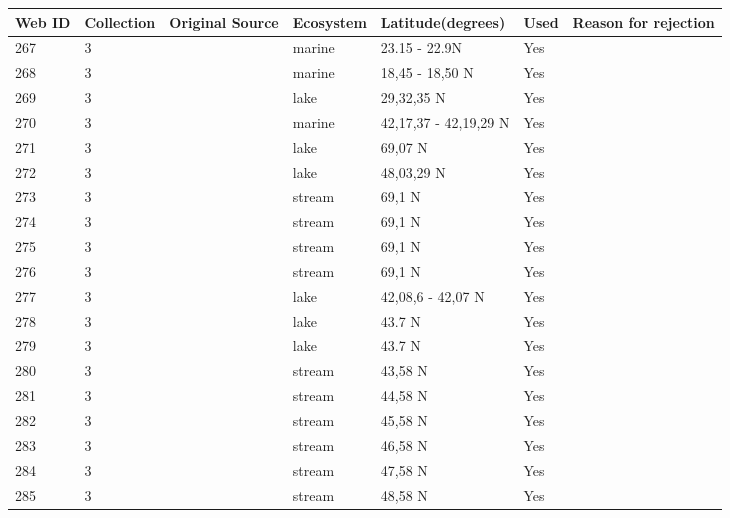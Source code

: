 \documentclass[12pt]{article}
\begin{document}
\begin{landscape}
    \begin{table}[h!]
    \centering
    {\footnotesize
      \begin{tabular}{p{2.8cm}p{1.3cm}p{3cm}p{2.2cm}p{2.5cm}lp{8.2cm}}
        \hline
        Web ID & Collection & Original Source & Ecosystem & Latitude(degrees) & Used  & Reason for rejection  \\
        \hline
        267   & 3 & \cite{Zetina-Rejon2003}  & marine & 23.15 - 22.9N & Yes  &     \\
        268   & 3 & \cite{Cruz-Escalona2007}  & marine & 18,45 - 18,50 N & Yes  &     \\
        269   & 3 & \cite{Liu2007}  & lake  & 29,32,35 N & Yes  &     \\
        270   & 3 & \cite{Filgueira2011}  & marine & 42,17,37 - 42,19,29 N & Yes   &       \\
        271   & 3 & \cite{Amundsen2013}  & lake  & 69,07 N & Yes   &        \\
        272   & 3 & \cite{Hampton2011}    & lake  & 48,03,29 N & Yes   &       \\
        273   & 3 & \cite{Parker2006}  & stream & 69,1 N & Yes   &       \\
        274   & 3 & \cite{Parker2006}  & stream & 69,1 N & Yes   &       \\
        275   & 3 & \cite{Parker2006}  & stream & 69,1 N & Yes   &       \\
        276   & 3 & \cite{Parker2006}  & stream & 69,1 N & Yes   &       \\
        277   & 3 & \cite{Massana1996}  & lake  & 42,08,6 - 42,07 N & Yes   &       \\
        278   & 3 & \cite{Stewart2011}    & lake  & 43.7 N & Yes   &       \\
        279   & 3 & \cite{Stewart2011}    & lake  & 43.7 N & Yes   &       \\
        280   & 3 & \cite{Cromar1996}  & stream & 43,58 N & Yes   &       \\
        281   & 3 & \cite{Cromar1996}  & stream & 44,58 N & Yes   &       \\
        282   & 3 & \cite{Cromar1996}  & stream & 45,58 N & Yes   &       \\
        283   & 3 & \cite{Cromar1996}  & stream & 46,58 N & Yes   &       \\
        284   & 3 & \cite{Cromar1996}  & stream & 47,58 N & Yes   &       \\
        285   & 3 & \cite{Cromar1996}  & stream & 48,58 N & Yes   &       \\

\end{tabular}}
\end{table}
\end{landscape}
\end{document}
